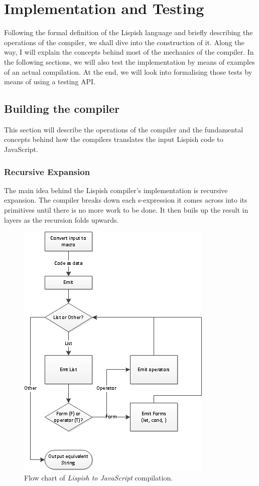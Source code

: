 \chapter{Implementation and Testing}
Following the formal definition of the Lispish language and briefly describing the operations of the compiler, we shall dive into the construction of it. Along the way, I will explain the concepts behind most of the mechanics of the compiler. 
In the following sections, we will also test the implementation by means of examples of an actual compilation. 
At the end, we will look into formalising those tests by means of using a testing API.  

\section{Building the compiler}
This section will describe the operations of the compiler and the fundamental concepts behind how the compilers translates the input Lispish code to JavaScript. 

\subsection{Recursive Expansion}
The main idea behind the Lispish compiler's implementation is recursive expansion.
The compiler breaks down each s-expression it comes across into its primitives until there is no more work to be done. It then buils up the result in layers as the recursion folds upwards. 

\begin{figure}[!htbp]
	\centering
	\includegraphics{Graphics/implementation_flowchart.jpg}
	\caption[yadayada]
   {Flow chart of \textit{Lispish to JavaScript} compilation.}
\end{figure}

